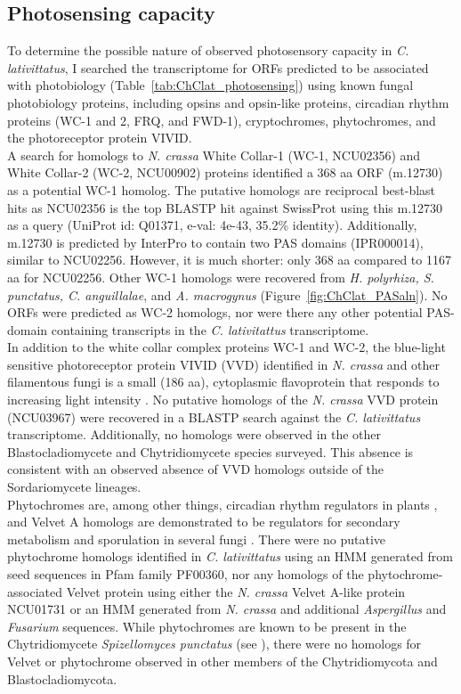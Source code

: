 \subsection*{Photosensing capacity}
To determine the possible nature of observed photosensory capacity in \textit{C. lativittatus}, I searched the transcriptome for ORFs predicted to be associated with photobiology (Table~\ref{tab:ChClat_photosensing}) using known fungal photobiology proteins, including opsins and opsin-like proteins, circadian rhythm proteins (WC-1 and 2, FRQ, and FWD-1), cryptochromes, phytochromes, and the photoreceptor protein VIVID. \\
\indent A search for homologs to \textit{N. crassa} White Collar-1 (WC-1, NCU02356) and White Collar-2 (WC-2, NCU00902) proteins identified a 368 aa ORF (m.12730) as a potential WC-1 homolog. The putative homologs are reciprocal best-blast hits as NCU02356 is the top BLASTP hit against SwissProt using this m.12730 as a query (UniProt id: Q01371, e-val: 4e-43, 35.2\% identity). Additionally, m.12730 is predicted by InterPro to contain two PAS domains (IPR000014), similar to NCU02256. However, it is much shorter: only 368 aa compared to 1167 aa for NCU02256. Other WC-1 homologs were recovered from \textit{H. polyrhiza, S. punctatus, C. anguillalae}, and \textit{A. macrogynus} (Figure~\ref{fig:ChClat_PASaln}). No ORFs were predicted as WC-2 homologs, nor were there any other potential PAS-domain containing transcripts in the \textit{C. lativitattus} transcriptome. \\
\indent In addition to the white collar complex proteins WC-1 and WC-2, the blue-light sensitive photoreceptor protein VIVID (VVD) identified in \textit{N. crassa} and other filamentous fungi is a small (186 aa), cytoplasmic flavoprotein that responds to increasing light intensity \cite{Schwerdtfeger2003}. No putative homologs of the \textit{N. crassa} VVD protein (NCU03967) were recovered in a BLASTP search against the \textit{C. lativittatus} transcriptome. Additionally, no homologs were observed in the other Blastocladiomycete and Chytridiomycete species surveyed. This absence is consistent with an observed absence of VVD homologs outside of the Sordariomycete lineages.\\
\indent Phytochromes are, among other things, circadian rhythm regulators in plants \cite{Rockwell2006}, and Velvet A homologs are demonstrated to be regulators for secondary metabolism and sporulation in several fungi \cite{Calvo2008}. There were no putative phytochrome homologs identified in \textit{C. lativittatus} using an HMM generated from seed sequences in Pfam family PF00360, nor any homologs of the phytochrome-associated Velvet protein using either the \textit{N. crassa} Velvet A-like protein NCU01731 or an HMM generated from \textit{N. crassa} and additional \textit{Aspergillus} and \textit{Fusarium} sequences. While phytochromes are known to be present in the Chytridiomycete \textit{Spizellomyces punctatus} (see \cite{Idnurm2010}), there were no homologs for Velvet or phytochrome observed in other members of the Chytridiomycota and Blastocladiomycota. \\
